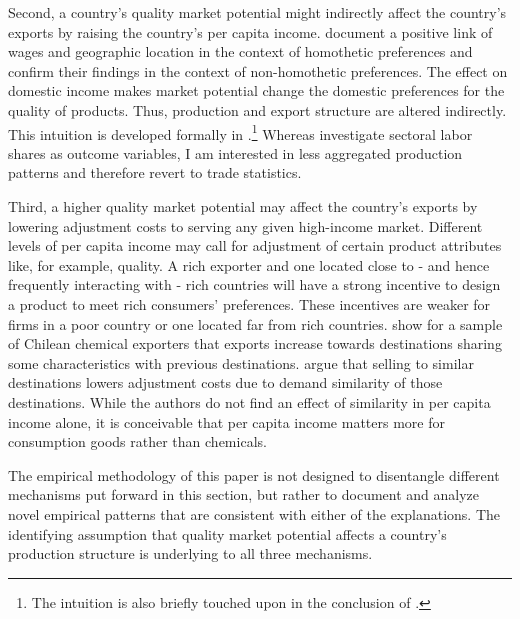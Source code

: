 \documentclass[12pt,a4paper,oneside,times]{article}   	%
\begin{document}
Second, a country's quality market potential might indirectly affect the country's exports by raising the country's per capita income. \cite{Redding2004} document a positive link of wages and geographic location in the context of homothetic preferences and \cite{Liu2019} confirm their findings in the context of non-homothetic preferences.
The effect on domestic income makes market potential change the domestic preferences for the quality of products. Thus, production and export structure are altered indirectly. This intuition is developed formally in \cite{Breinlich2013}.\footnote{The intuition is also briefly touched upon in the conclusion of \cite{Matsuyama2019}.} Whereas \cite{Breinlich2013} investigate sectoral labor shares as outcome variables, I am interested in less aggregated production patterns and therefore revert to trade statistics. 

 
Third, a higher quality market potential may affect the country's exports by lowering adjustment costs to serving any given high-income market. Different levels of per capita income may call for adjustment of certain product attributes like, for example, quality. A rich exporter and one located close to - and hence frequently interacting with - rich countries will have a strong incentive to design a product to meet rich consumers' preferences. These incentives are weaker for firms in a poor country or one located far from rich countries.  %
 \cite{Morales2019} show for a sample of Chilean chemical exporters that exports increase towards destinations sharing some characteristics with previous destinations. \cite{Morales2019} argue that selling to similar destinations lowers adjustment costs due to demand similarity of those destinations. While the authors do not find an effect of similarity in per capita income alone, it is conceivable that per capita income matters more for consumption goods rather than chemicals. 

The empirical methodology of this paper is not designed to disentangle different mechanisms put forward in this section, but rather to document and analyze novel empirical patterns that are consistent with either of the explanations. The identifying assumption that quality market potential affects a country's production structure is underlying to all three mechanisms. 
\end{document}
